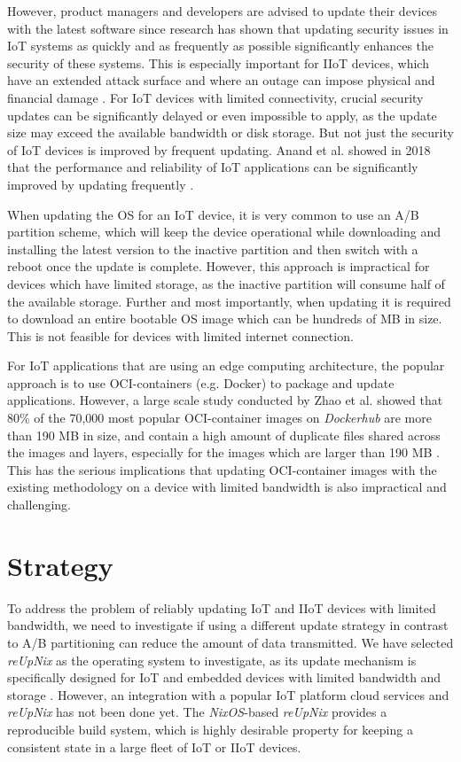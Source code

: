 However, product managers and developers are advised to update their devices with
the latest software since
research has shown that updating security issues in \ac{IoT} systems as quickly
and as frequently as possible significantly enhances the security of these systems.
This is especially important for \ac{IIoT} devices, which have an extended attack
surface and where an outage can impose physical and financial damage \cite{s20247160}.
For \ac{IoT} devices with limited connectivity, crucial security updates can be
significantly delayed or even impossible to apply, as the update size may exceed
the available bandwidth or disk storage. But not just the security of \ac{IoT}
devices is improved by frequent updating. Anand et al. showed in 2018 that the
performance and reliability of \ac{IoT} applications can be significantly improved
by updating frequently \cite{Anand2018}.

When updating the \ac{OS} for an \ac{IoT} device, it is very common to use an
A/B partition scheme, which will keep the device operational while downloading
and installing the latest version to the inactive partition and then switch with
a reboot once the update is complete. However, this approach is impractical for
devices which have limited storage, as the inactive partition will consume
half of the available storage. Further and most importantly, when updating
it is required to download an entire bootable \ac{OS} image which can be
hundreds of \ac{MB} in size. This is not feasible for devices with limited
internet connection.

For \ac{IoT} applications that are using an edge computing architecture, the popular
approach is to use \ac{OCI}-containers (e.g. Docker) to package and update applications.
However, a large scale study conducted by Zhao et al. showed that 80\% of the
70,000 most popular \ac{OCI}-container images on \textit{Dockerhub} are more than
190 \ac{MB} in size, and contain a high amount of duplicate files shared across the images
and layers, especially for the images which are larger than 190 \ac{MB} \cite{9242268}.
This has the serious implications that updating \ac{OCI}-container images with
the existing methodology on a device with limited bandwidth is also impractical
and challenging.
\clearpage

\section{Strategy}
To address the problem of reliably updating \ac{IoT} and \ac{IIoT}
devices with limited bandwidth, we need to investigate if using a different
update strategy in contrast to A/B partitioning can reduce the amount of data transmitted.
We have selected \textit{reUpNix} as the operating system to investigate, as its
update mechanism is specifically designed for \ac{IoT} and embedded devices with
limited bandwidth and storage \cite{gollenstede:23:lctes}. However, an integration
with a popular \ac{IoT} platform cloud services and \textit{reUpNix} has not
been done yet. The \textit{NixOS}-based \textit{reUpNix} provides a reproducible
build system, which is highly desirable property for keeping a consistent state
in a large fleet of \ac{IoT} or \ac{IIoT} devices.

